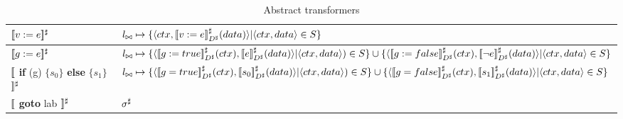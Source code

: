 \begin{table}
\footnotesize
\begin{tabular}{ll}
\hline
$\lbrack\!\lbrack v:=e \rbrack\!\rbrack^{\sharp}$ & $l_{\bowtie} \mapsto \{\langle ctx,\lbrack\!\lbrack v:=e \rbrack\!\rbrack^{\sharp}_{D^\sharp}(data) \rangle | \langle ctx,data \rangle \in S \}$
\\ \hline
$\lbrack\!\lbrack g:=e \rbrack\!\rbrack^{\sharp}$ & $l_{\correlate} \mapsto \{\langle \asemp{g:=true}_{\A{D}}(ctx),\asemp{e}_{\A{D}}(data) \rangle  | \langle ctx,data \rangle) \in S \} \cup \{ \langle \asemp{g:=false}_{\A{D}}(ctx),\asemp{\neg e}_{\A{D}}(data) \rangle | \langle ctx, data \rangle \in S \}$
\\ \hline
$\lbrack\!\lbrack$ \textbf{if} (g) $\{s_{0}\}$ \textbf{else} $\{s_{1}\}$ $\rbrack\!\rbrack^{\sharp}$ &
$l_{\correlate} \mapsto \{\langle\asemp{g=true}_{\A{D}}(ctx),  \asemp{s_0}_{\A{D}}(data) \rangle | \langle ctx,data \rangle) \in S \} \cup \{\langle \asemp{g=false}_{\A{D}}(ctx), \asemp{s_1}_{\A{D}}(data) \rangle | \langle ctx,data \rangle \in S \}$
\\ \hline
$\lbrack\!\lbrack$ \textbf{goto} lab $\rbrack\!\rbrack^{\sharp}$& $\sigma^\sharp$
\\ \hline
\end{tabular}
\caption{Abstract transformers}\label{Ta:AbsTrans}
\end{table}